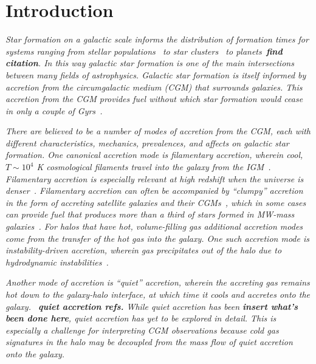\documentclass[fleqn,usenatbib]{mnras}
\begin{document}
\section{Introduction}
\label{s: introduction}

\textit{
Star formation on a galactic scale informs the distribution of formation times for systems ranging from stellar populations~\cite{Yu2021} to star clusters~\citep[e.g.][]{Grudic2020} to planets~\textbf{find citation}.
In this way galactic star formation is one of the main intersections between many fields of astrophysics.
Galactic star formation is itself informed by accretion from the circumgalactic medium (CGM) that surrounds galaxies.
This accretion from the CGM provides fuel without which star formation would cease in only a couple of Gyrs~\cite[e.g.][]{Prochaska2009, Bauermeister2010, Spring2017}.
}

\textit{
There are believed to be a number of modes of accretion from the CGM, each with different characteristics, mechanics, prevalences, and affects on galactic star formation.
One canonical accretion mode is filamentary accretion, wherein cool, $T \sim 10^4$ K cosmological filaments travel into the galaxy  from the IGM~\cite[e.g.][]{Keres2005, Dekel2006, Keres2009, Martin2019a}.
Filamentary accretion is especially relevant at high redshift when the universe is denser~\citep[e.g.][]{Keres2009a, Stern2019, Huscher2020}.
Filamentary accretion can often be accompanied by ``clumpy'' accretion in the form of accreting satellite galaxies and their CGMs~\citep[e.g.][]{Hafen2019, Hafen2020}, which in some cases can provide fuel that produces more than a third of stars formed in MW-mass galaxies~\citep{Angles-Alcazar2017}.
For halos that have hot, volume-filling gas additional accretion modes come from the transfer of the hot gas into the galaxy.
One such accretion mode is instability-driven accretion, wherein gas precipitates out of the halo due to hydrodynamic instabilities~\citep[e.g.][]{Maller2004, Mccourt2012, Voit2015, Armillotta2016, Gronke2019a, Esmerian2020, Voit2021}.
}

\textit{
Another mode of accretion is ``quiet'' accretion, wherein the accreting gas remains hot down to the galaxy-halo interface, at which time it cools and accretes onto the galaxy.
~\textbf{quiet accretion refs.}
While quiet accretion has been \textbf{insert what's been done here}, quiet accretion has yet to be explored in detail.
This is especially a challenge for interpreting CGM observations because cold gas signatures in the halo may be decoupled from the mass flow of quiet accretion onto the galaxy.
}
\end{document}
